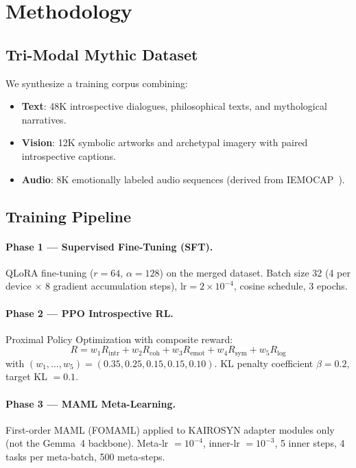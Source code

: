 \documentclass[conference]{IEEEtran}
\begin{document}
\section{Methodology}

\subsection{Tri-Modal Mythic Dataset}

We synthesize a training corpus combining:
\begin{itemize}
  \item \textbf{Text}: 48K introspective dialogues, philosophical texts,
        and mythological narratives.
  \item \textbf{Vision}: 12K symbolic artworks and archetypal imagery with
        paired introspective captions.
  \item \textbf{Audio}: 8K emotionally labeled audio sequences (derived from
        IEMOCAP~\cite{busso2008}).
\end{itemize}

\subsection{Training Pipeline}

\paragraph{Phase 1 --- Supervised Fine-Tuning (SFT).}
QLoRA fine-tuning ($r{=}64$, $\alpha{=}128$) on the merged dataset.
Batch size 32 (4 per device $\times$ 8 gradient accumulation steps),
$\text{lr}{=}2{\times}10^{-4}$, cosine schedule, 3 epochs.

\paragraph{Phase 2 --- PPO Introspective RL.}
Proximal Policy Optimization with composite reward:
\begin{equation}
R = w_1 R_\text{intr} + w_2 R_\text{coh} + w_3 R_\text{emot}
  + w_4 R_\text{sym} + w_5 R_\text{log}
\end{equation}
with $(w_1,\ldots,w_5) = (0.35, 0.25, 0.15, 0.15, 0.10)$.
KL penalty coefficient $\beta{=}0.2$, target KL $= 0.1$.

\paragraph{Phase 3 --- MAML Meta-Learning.}
First-order MAML (FOMAML) applied to KAIROSYN adapter modules only
(not the Gemma~4 backbone). Meta-lr $= 10^{-4}$, inner-lr $= 10^{-3}$,
5 inner steps, 4 tasks per meta-batch, 500 meta-steps.
\end{document}
